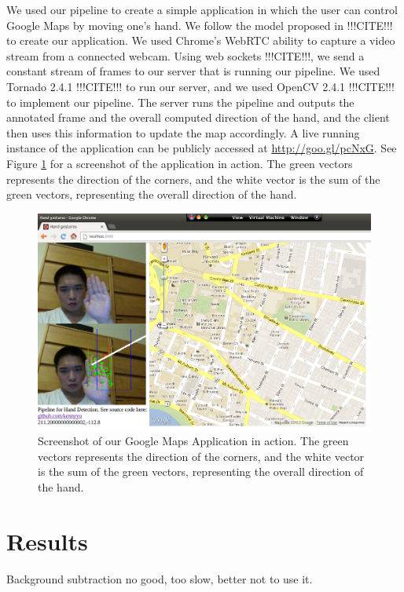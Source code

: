 \documentclass[12pt]{article}
\begin{document}
We used our pipeline to create a simple application in which the user can control Google Maps by moving one's hand. We follow the model proposed in !!!CITE!!! to create our application. We used Chrome's WebRTC ability to capture a video stream from a connected webcam. Using web sockets !!!CITE!!!, we send a constant stream of frames to our server that is running our pipeline. We used Tornado 2.4.1 !!!CITE!!! to run our server, and we used OpenCV 2.4.1 !!!CITE!!! to implement our pipeline. The server runs the pipeline and outputs the annotated frame and the overall computed direction of the hand, and the client then uses this information to update the map accordingly. A live running instance of the application can be publicly accessed at \url{http://goo.gl/pcNxG}. See Figure \ref{map} for a screenshot of the application in action. The green vectors represents the direction of the corners, and the white vector is the sum of the green vectors, representing the overall direction of the hand.

\noindent\begin{figure}[H]
\centering
\includegraphics[scale=0.45]{map.png}
\caption{Screenshot of our Google Maps Application in action. The green vectors represents the direction of the corners, and the white vector is the sum of the green vectors, representing the overall direction of the hand.}
\label{map}
\end{figure}

\section{Results}

Background subtraction no good, too slow, better not to use it. 
\end{document}
